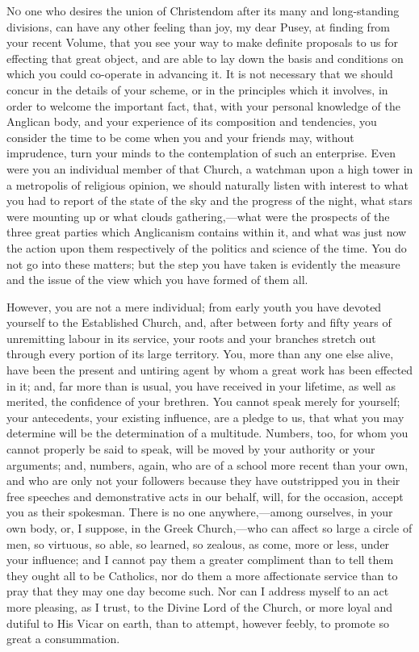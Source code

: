 

N\textsc{o} one who desires the union of Christendom after its many and
long-standing divisions, can have any other feeling than joy, my dear
Pusey, at finding from your recent Volume, that you see your way to make
definite proposals to us for effecting that great object, and are able
to lay down the basis and conditions on which you could co-operate in
advancing it. It is not necessary that we should concur in the details
of your scheme, or in the principles which it involves, in order to
welcome the important fact, that, with your personal knowledge of the
Anglican body, and your experience of its composition and tendencies,
you consider the time to be come when you and your friends may, without
imprudence, turn your minds to the contemplation of such an enterprise.
Even were you an individual member of that Church, a watchman upon a
high tower in a metropolis of religious opinion, we should naturally
listen with interest to what you had to report of the state of the sky
and the progress of the night, what stars were mounting up or what
clouds gathering,—what were the prospects of the three great parties
which Anglicanism contains within it, and what was just now the action
upon them respectively of the politics and science of the time. You do
not go into these matters; but the step you have taken is evidently the
measure and the issue of the view which you have formed of them all.

However, you are not a mere individual; from early youth you have
devoted yourself to the Established Church, and, after between forty and
fifty years of unremitting labour in its service, your roots and your
branches stretch out through every portion of its large territory. You,
more than any one else alive, have been the present and untiring agent
by whom a great work has been effected in it; and, far more than is
usual, you have received in your lifetime, as well as merited, the
confidence of your brethren. You cannot speak merely for yourself; your
antecedents, your existing influence, are a pledge to us, that what you
may determine will be the determination of a multitude. Numbers, too,
for whom you cannot properly be said to speak, will be moved by your
authority or your arguments; and, numbers, again, who are of a school
more recent than your own, and who are only not your followers because
they have outstripped you in their free speeches and demonstrative acts
in our behalf, will, for the occasion, accept you as their spokesman.
There is no one anywhere,—among ourselves, in your own body, or, I
suppose, in the Greek Church,—who can affect so large a circle of men,
so virtuous, so able, so learned, so zealous, as come, more or less,
under your influence; and I cannot pay them a greater compliment than to
tell them they ought all to be Catholics, nor do them a more
affectionate service than to pray that they may one day become such. Nor
can I address myself to an act more pleasing, as I trust, to the Divine
Lord of the Church, or more loyal and dutiful to His Vicar on earth,
than to attempt, however feebly, to promote so great a consummation.


